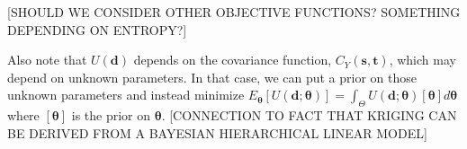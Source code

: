 \documentclass[12pt]{article}
\begin{document}
[SHOULD WE CONSIDER OTHER OBJECTIVE FUNCTIONS? SOMETHING DEPENDING ON ENTROPY?]

Also note that $U(\bm{d})$ depends on the covariance function, $C_Y(\bm{s},\bm{t})$, which may depend on unknown parameters. In that case, we can put a prior on those unknown parameters and instead minimize $E_{\bm{\theta}}[U(\bm{d};\bm{\theta})] = \int_{\Theta}U(\bm{d};\bm{\theta})[\bm{\theta}]d\bm{\theta}$ where $[\bm{\theta}]$ is the prior on $\bm{\theta}$. [CONNECTION TO FACT THAT KRIGING CAN BE DERIVED FROM A BAYESIAN HIERARCHICAL LINEAR MODEL]
\clearpage\pagebreak\newpage\thispagestyle{empty}
%
\end{document}
